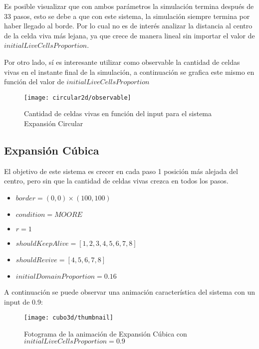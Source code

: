 Es posible visualizar que con ambos parámetros la simulación termina después de 33 pasos, esto se debe a que con este sistema, la simulación
siempre termina por haber llegado al borde. Por lo cual no es de interés analizar la distancia al centro de la celda viva más lejana, ya que
crece de manera lineal sin importar el valor de $initialLiveCellsProportion$.

Por otro lado, sí es interesante utilizar como observable la cantidad de celdas vivas en el instante final de la simulación, a continuación se
grafica este mismo en función del valor de $initialLiveCellsProportion$


\begin{figure}[H]
    \centering
    \texttt{[image: circular2d/observable]}
    \caption{Cantidad de celdas vivas en función del input para el sistema Expansión Circular}
    \label{fig:circular2d_observable}
\end{figure}






\subsection{Expansión Cúbica}\label{subsec:cubito-3D}

El objetivo de este sistema es crecer en cada paso 1 posición más alejada del centro, pero sin que la cantidad de celdas vivas crezca en todos los pasos.

\begin{itemize}
    \item $border = (0, 0) \times (100, 100)$
    \item $condition = MOORE$
    \item $r = 1$
    \item $shouldKeepAlive = [1, 2, 3, 4, 5, 6, 7, 8]$
    \item $shouldRevive = [4, 5, 6, 7, 8]$
    \item $initialDomainProportion = 0.16$
\end{itemize}


A continuación se puede observar una animación característica del sistema con un input de 0.9:

\begin{figure}[H]
    \centering
    \texttt{[image: cubo3d/thumbnail]}
    \caption{Fotograma de la animación de Expansión Cúbica con $initialLiveCellsProportion = 0.9$}
    \label{fig:thumbnailcubo3d_i90}
\end{figure}

